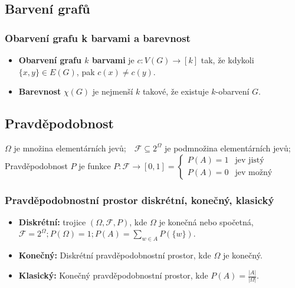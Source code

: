 \documentclass[10pt,a4paper]{article}
\begin{document}
\subsection{Barvení grafů}

\subsubsection{Obarvení grafu k barvami a barevnost}

\begin{itemize}
    \item \textbf{Obarvení grafu $k$ barvami} je $c:V(G) \to [k]$ tak, že kdykoli $\{x,y\}\in E(G)$, pak $c(x) \neq c(y)$.
    \item \textbf{Barevnost} $\chi(G)$ je nejmenší $k$ takové, že existuje $k$-obarvení $G$.
\end{itemize}

\subsection{Pravděpodobnost}

$\Omega$ je množina elementárních jevů; $ $ $ $
$\mathcal{F} \subseteq 2^\Omega $ je podmnožina elementárních jevů;\\
Pravděpodobnost $P$ je funkce $P:\mathcal{F} \to [0,1] = 
    \begin{cases}
        P(A)=1 & \text{jev jistý}\\
        P(A)=0 & \text{jev možný}
    \end{cases}$

\subsubsection{Pravděpodobnostní prostor diskrétní, konečný, klasický}
\begin{itemize}
    \item \textbf{Diskrétní:} trojice $(\Omega, \mathcal{F}, P)$, kde $\Omega$ je konečná nebo spočetná, $\mathcal{F} = 2^{\Omega}; P(\Omega) = 1; \displaystyle P(A) = \sum_{w\in A} P(\{w\})$.
    \item \textbf{Konečný:} Diskrétní pravděpodobnostní prostor, kde $\Omega$ je konečný.
    \item \textbf{Klasický:} Konečný pravděpodobnostní prostor, kde $P(A) = \frac{|A|}{|\Omega |}$.
\end{itemize}
\end{document}
